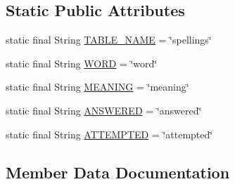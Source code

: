 \subsection*{Static Public Attributes}
\begin{DoxyCompactItemize}
\item 
static final String \hyperlink{classorg_1_1buildmlearn_1_1toolkit_1_1learnspelling_1_1data_1_1SpellContract_1_1Spellings_ae800fd714d5ea80de21c807c9b93d2be}{T\+A\+B\+L\+E\+\_\+\+N\+A\+ME} = \char`\"{}spellings\char`\"{}
\item 
static final String \hyperlink{classorg_1_1buildmlearn_1_1toolkit_1_1learnspelling_1_1data_1_1SpellContract_1_1Spellings_ac2a3d72883e5931f0fea06f44698fb92}{W\+O\+RD} = \char`\"{}word\char`\"{}
\item 
static final String \hyperlink{classorg_1_1buildmlearn_1_1toolkit_1_1learnspelling_1_1data_1_1SpellContract_1_1Spellings_ab23d71c57f617273f1914bc8bfa25e6a}{M\+E\+A\+N\+I\+NG} = \char`\"{}meaning\char`\"{}
\item 
static final String \hyperlink{classorg_1_1buildmlearn_1_1toolkit_1_1learnspelling_1_1data_1_1SpellContract_1_1Spellings_ad60a6b27e03d61a9760b00df0ea59056}{A\+N\+S\+W\+E\+R\+ED} = \char`\"{}answered\char`\"{}
\item 
static final String \hyperlink{classorg_1_1buildmlearn_1_1toolkit_1_1learnspelling_1_1data_1_1SpellContract_1_1Spellings_af2255e71f211212efe70063b65f9b9e1}{A\+T\+T\+E\+M\+P\+T\+ED} = \char`\"{}attempted\char`\"{}
\end{DoxyCompactItemize}


\subsection{Member Data Documentation}
